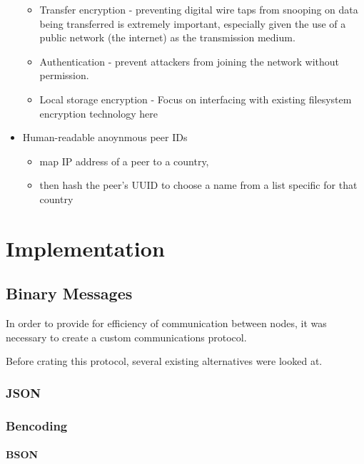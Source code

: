 \documentclass[12pt,a4paper,]{book}
\begin{document}
\begin{itemize}
  \begin{itemize}
  \itemsep1pt\parskip0pt
  \item
    Transfer encryption - preventing digital wire taps from snooping on
    data being transferred is extremely important, especially given the
    use of a public network (the internet) as the transmission medium.
  \item
    Authentication - prevent attackers from joining the network without
    permission.
  \item
    Local storage encryption - Focus on interfacing with existing
    filesystem encryption technology here
  \end{itemize}
\item
  Human-readable anoynmous peer IDs

  \begin{itemize}
  \itemsep1pt\parskip0pt
  \item
    map IP address of a peer to a country,
  \item
    then hash the peer's UUID to choose a name from a list specific for
    that country
  \end{itemize}
\end{itemize}

\section{Implementation}\label{implementation}

\subsection{Binary Messages}\label{binary-messages}

In order to provide for efficiency of communication between nodes, it
was necessary to create a custom communications protocol.

Before crating this protocol, several existing alternatives were looked
at.

\subsubsection{JSON}\label{json}

\subsubsection{Bencoding}\label{bencoding}

\paragraph{BSON}\label{bson}
\end{document}
